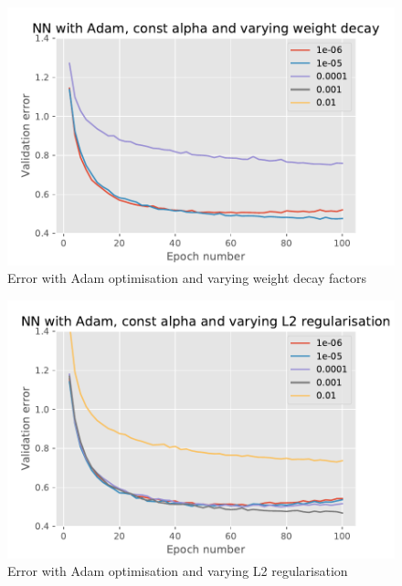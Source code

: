\documentclass{article}
\begin{document}
\begin{appendices}

\begin{figure}[H]
\vskip 5mm
\begin{center}
\centerline{\includegraphics[width=\columnwidth]{ex4_wd_comparison.pdf}}
\caption{Error with Adam optimisation and varying weight decay factors}
\label{fig:ex4_wd}
\end{center}
\vskip -5mm
\end{figure}

\begin{figure}[H]
\vskip 5mm
\begin{center}
\centerline{\includegraphics[width=\columnwidth]{ex4_l2_comparison.pdf}}
\caption{Error with Adam optimisation and varying L2 regularisation}
\label{fig:ex4_l2}
\end{center}
\vskip -5mm
\end{figure}

\end{appendices}

\vspace{70mm}


\end{document}
